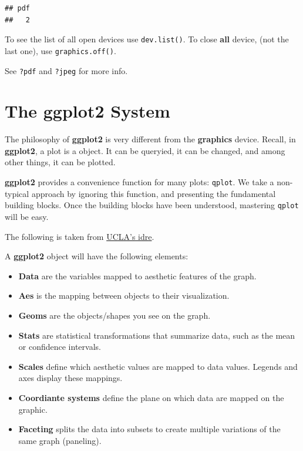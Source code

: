 \documentclass[]{book}
\providecommand{\tightlist}{%
  \setlength{\itemsep}{0pt}\setlength{\parskip}{0pt}}
\theoremstyle{definition}
\theoremstyle{definition}
\theoremstyle{remark}
\begin{document}
\begin{verbatim}
## pdf 
##   2
\end{verbatim}

To see the list of all open devices use \texttt{dev.list()}. To close
\textbf{all} device, (not the last one), use \texttt{graphics.off()}.

See \texttt{?pdf} and \texttt{?jpeg} for more info.

\section{The ggplot2 System}\label{the-ggplot2-system}

The philosophy of \textbf{ggplot2} is very different from the
\textbf{graphics} device. Recall, in \textbf{ggplot2}, a plot is a
object. It can be queryied, it can be changed, and among other things,
it can be plotted.

\textbf{ggplot2} provides a convenience function for many plots:
\texttt{qplot}. We take a non-typical approach by ignoring this
function, and presenting the fundamental building blocks. Once the
building blocks have been understood, mastering \texttt{qplot} will be
easy.

The following is taken from
\href{http://www.ats.ucla.edu/stat/r/seminars/ggplot2_intro/ggplot2_intro.htm}{UCLA's
idre}.

A \textbf{ggplot2} object will have the following elements:

\begin{itemize}
\tightlist
\item
  \textbf{Data} are the variables mapped to aesthetic features of the
  graph.
\item
  \textbf{Aes} is the mapping between objects to their visualization.
\item
  \textbf{Geoms} are the objects/shapes you see on the graph.
\item
  \textbf{Stats} are statistical transformations that summarize data,
  such as the mean or confidence intervals.
\item
  \textbf{Scales} define which aesthetic values are mapped to data
  values. Legends and axes display these mappings.
\item
  \textbf{Coordiante systems} define the plane on which data are mapped
  on the graphic.
\item
  \textbf{Faceting} splits the data into subsets to create multiple
  variations of the same graph (paneling).
\end{itemize}
\end{document}
